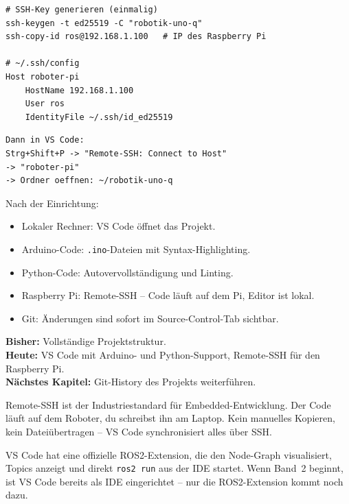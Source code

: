 \begin{lstlisting}[style=bash]
# SSH-Key generieren (einmalig)
ssh-keygen -t ed25519 -C "robotik-uno-q"
ssh-copy-id ros@192.168.1.100   # IP des Raspberry Pi

# ~/.ssh/config
Host roboter-pi
    HostName 192.168.1.100
    User ros
    IdentityFile ~/.ssh/id_ed25519
\end{lstlisting}

\begin{lstlisting}[style=text]
Dann in VS Code:
Strg+Shift+P -> "Remote-SSH: Connect to Host"
-> "roboter-pi"
-> Ordner oeffnen: ~/robotik-uno-q
\end{lstlisting}

\begin{loesungBox}
Nach der Einrichtung:
\begin{itemize}
  \item Lokaler Rechner: VS Code öffnet das Projekt.
  \item Arduino-Code: \texttt{.ino}-Dateien mit Syntax-Highlighting.
  \item Python-Code: Autovervollständigung und Linting.
  \item Raspberry Pi: Remote-SSH -- Code läuft auf dem Pi, Editor ist lokal.
  \item Git: Änderungen sind sofort im Source-Control-Tab sichtbar.
\end{itemize}
\end{loesungBox}

\begin{projektBox}
\textbf{Bisher:} Vollständige Projektstruktur.\\
\textbf{Heute:} VS Code mit Arduino- und Python-Support,
Remote-SSH für den Raspberry Pi.\\
\textbf{Nächstes Kapitel:} Git-History des Projekts weiterführen.
\end{projektBox}

\begin{merksatzBox}
Remote-SSH ist der Industriestandard für Embedded-Entwicklung.
Der Code läuft auf dem Roboter, du schreibst ihn am Laptop.
Kein manuelles Kopieren, kein Dateiübertragen -- VS Code
synchronisiert alles über SSH.
\end{merksatzBox}

\begin{robotikBox}
VS Code hat eine offizielle ROS2-Extension, die den Node-Graph
visualisiert, Topics anzeigt und direkt \texttt{ros2 run}
aus der IDE startet. Wenn Band~2 beginnt, ist VS Code
bereits als IDE eingerichtet -- nur die ROS2-Extension kommt noch dazu.
\end{robotikBox}

